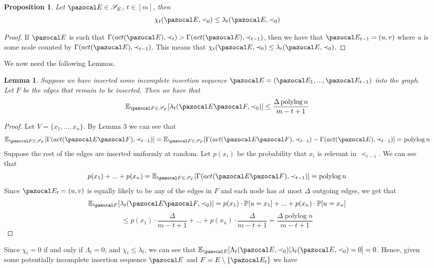 \documentclass{report}
\newtheorem{lemma}{Lemma}
\newtheorem{proposition}{Proposition}
\DeclareMathOperator*{\polylog}{polylog}
\begin{document}
\begin{proposition}
Let $\pazocal E \in \mathcal S_E$, $t \in [m]$, then \[\chi_t(\pazocal E, \prec_0) \leq \lambda_t(\pazocal E, \prec_0)\]
\end{proposition}

\begin{proof}
If $\pazocal E$ is such that $\Gamma(act(\pazocal E), \prec_{t}) > \Gamma(act(\pazocal E), \prec_{t-1})$, then we have that $\pazocal E_{t-1}=(u,v)$ where $u$ is some node counted by $\Gamma(act(\pazocal E), \prec_{t-1})$. This means that $\chi_t(\pazocal E, \prec_0) \leq \lambda_t(\pazocal E, \prec_0)$.
\end{proof}

We now need the following Lemmas.

\begin{lemma}
Suppose we have inserted some incomplete insertion sequence $\pazocal E = (\pazocal E_1,...,\pazocal E_{t-1})$ into the graph. Let $F$ be the edges that remain to be inserted. Then we have that
\[ \mathbb E_{\pazocal F \in \mathcal S_F} [\lambda_t(\pazocal E \pazocal F, \prec_0)] \leq \frac{\Delta\polylog n}{m-t+1} \]
\end{lemma}

\begin{proof}
Let $V=\{x_1,...,x_n\}$. By Lemma 3 we can see that
\[ \mathbb E_{\pazocal F \in \mathcal S_F}[\Gamma(act(\pazocal E \pazocal F), \prec_{t-1})] = \mathbb E_{\pazocal F \in \mathcal S_F}[\Gamma(act(\pazocal E \pazocal F), \prec_{t-1}) - \Gamma(act(\pazocal E), \prec_{t-1})] = \polylog n \] 
Suppose the rest of the edges are inserted uniformly at random. Let $p(x_i)$ be the probability that $x_i$ is relevant in $\prec_{t-1}$. We can see that
\[ p(x_1) +...+p(x_n) =  \mathbb E_{\pazocal F \in \mathcal S_F}[\Gamma(act(\pazocal E \pazocal F), \prec_{t-1})] = \polylog n \]
Since $\pazocal E_t=(u,v)$ is equally likely to be any of the edges in $F$ and each node has at most $\Delta$ outgoing edges, we get that
\[ \mathbb E_{\pazocal F}[\lambda_t(\pazocal E \pazocal F, \prec_0)] = p(x_1) \cdot \mathbb P[u=x_1]+...+ p(x_n) \cdot \mathbb P[u=x_n]\]
\[ \leq p(x_1) \cdot \frac{\Delta}{m-t+1}+...+ p(x_n) \cdot \frac{\Delta}{m-t+1} =\frac{\Delta\polylog n}{m-t+1}\]
\end{proof}

Since $\chi_t = 0$ if and only if $\Lambda_t = 0$, and $\chi_t \leq \lambda_t$, we can see that $\mathbb E_{\pazocal E} [\Lambda_t(\pazocal E, \prec_0) \vert \lambda_t(\pazocal E, \prec_0) = 0] = 0$. Hence, given some potentially incomplete insertion sequence $\pazocal E$ and $F=E \setminus \{\pazocal E_t\}$ we have
\end{document}
